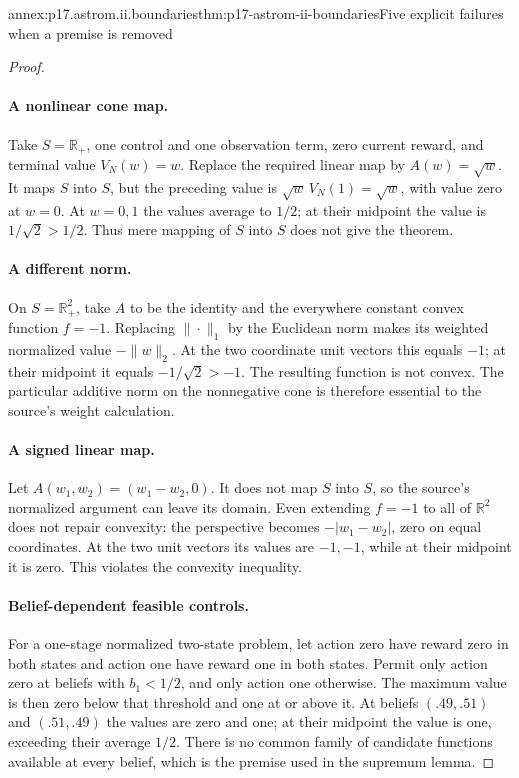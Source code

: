 \begin{annexitem}{annex:p17.astrom.ii.boundaries}{thm:p17-astrom-ii-boundaries}{Five explicit failures when a premise is removed}
\begin{proof}
\paragraph{A nonlinear cone map.}
Take \(S=\mathbb R_+\), one control and one
observation term, zero current reward, and
terminal value \(V_N(w)=w\).
Replace the required linear map by \(A(w)=\sqrt w\).
It maps \(S\) into \(S\), but the preceding
value is
\(\sqrt w\,V_N(1)=\sqrt w\), with value zero
at \(w=0\).
At \(w=0,1\) the values average to \(1/2\);
at their midpoint the value is \(1/\sqrt2>1/2\).
Thus mere mapping of \(S\) into \(S\)
does not give the theorem.

\paragraph{A different norm.}
On \(S=\mathbb R_+^2\), take \(A\) to be
the identity and the everywhere constant
convex function \(f=-1\).
Replacing \(\|\cdot\|_1\) by the Euclidean
norm makes its weighted normalized value
\(-\|w\|_2\). At the two coordinate unit
vectors this equals \(-1\); at their
midpoint it equals \(-1/\sqrt2>-1\).
The resulting function is not convex.
The particular additive norm on the
nonnegative cone is therefore essential
to the source's weight calculation.

\paragraph{A signed linear map.}
Let \(A(w_1,w_2)=(w_1-w_2,0)\).
It does not map \(S\) into \(S\), so the
source's normalized argument can leave
its domain. Even extending \(f=-1\)
to all of \(\mathbb R^2\) does not repair
convexity: the perspective becomes
\(-|w_1-w_2|\), zero on equal coordinates.
At the two unit vectors its values are
\(-1,-1\), while at their midpoint it
is zero. This violates the convexity
inequality.

\paragraph{Belief-dependent feasible controls.}
For a one-stage normalized two-state problem,
let action zero have reward zero in both
states and action one have reward one
in both states.
Permit only action zero at beliefs with
\(b_1<1/2\), and only action one otherwise.
The maximum value is then zero below
that threshold and one at or above it.
At beliefs \((.49,.51)\) and \((.51,.49)\)
the values are zero and one; at their
midpoint the value is one, exceeding
their average \(1/2\).
There is no common family of candidate
functions available at every belief,
which is the premise used in the supremum lemma.


\end{proof}
\end{annexitem}
